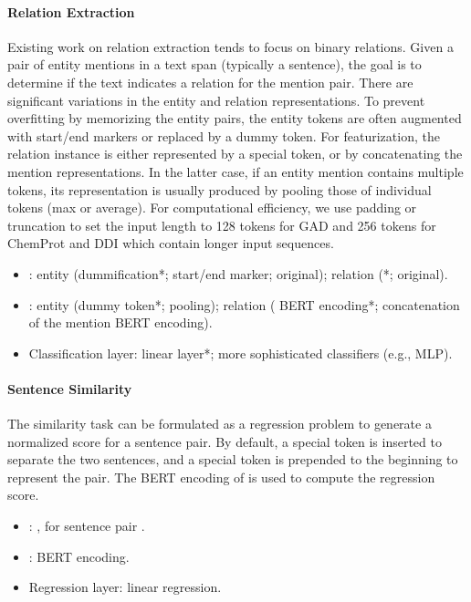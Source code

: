 \documentclass[acmlarge,screen,nonacm]{acmart}
\begin{document}
\paragraph{Relation Extraction} Existing work on relation extraction tends to focus on binary relations. Given a pair of entity mentions in a text span (typically a sentence), the goal is to determine if the text indicates a relation for the mention pair. 
There are significant variations in the entity and relation representations. To prevent overfitting by memorizing the entity pairs, the entity tokens are often augmented with start/end markers or replaced by a dummy token. For featurization, the relation instance is either represented by a special  token, or by concatenating the mention representations. In the latter case, if an entity mention contains multiple tokens, its representation is usually produced by pooling those of individual tokens (max or average). For computational efficiency, we use padding or truncation to set the input length to 128 tokens for GAD and 256 tokens for ChemProt and DDI which contain longer input sequences.
\begin{itemize}
    \item : entity (dummification*; start/end marker; original); relation (*; original).
    \item : entity (dummy token*; pooling); relation ( BERT encoding*; concatenation of the mention BERT encoding).
    \item Classification layer: linear layer*; more sophisticated classifiers (e.g., MLP).
\end{itemize}

\paragraph{Sentence Similarity} The similarity task can be formulated as a regression problem to generate a normalized score for a sentence pair. By default, a special  token is inserted to separate the two sentences, and a special  token is prepended to the beginning to represent the pair. The BERT encoding of  is used to compute the regression score.
\begin{itemize}
    \item :     , for sentence pair .
    \item :  BERT encoding.
    \item Regression layer: linear regression.
\end{itemize}
\end{document}
